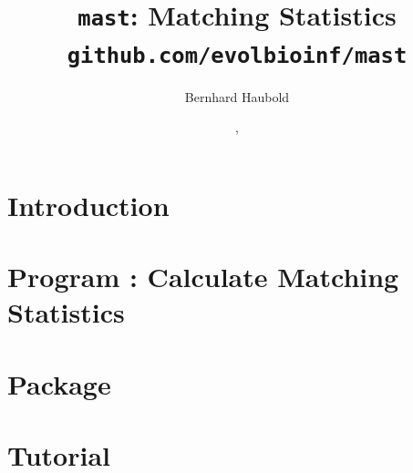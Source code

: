 \documentclass[a4paper]{report}
\begin{document}
\pagestyle{noweb}

\title{\texttt{mast}: Matching Statistics\\
\small\texttt{github.com/evolbioinf/mast}}
\author{Bernhard Haubold}
\date{\hspace{-3pt}, }
\maketitle
\tableofcontents

\chapter{Introduction}

\chapter{Program : Calculate Matching Statistics}\label{ch:an}

\chapter{Package }

\chapter{Tutorial}


\end{document}
